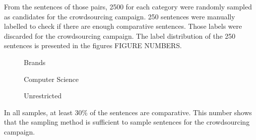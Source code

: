 From the sentences of those pairs, 2500 for each category were randomly sampled as candidates for the crowdsourcing campaign. 250 sentences were manually labelled to check if there are enough comparative sentences. Those labels were discarded for the crowdsourcing campaign.
The label distribution of the 250 sentences is presented in the figures FIGURE NUMBERS.

\begin{figure}[h]
    \centering
    \begin{minipage}{0.49\textwidth}
        \centering
               \caption{Brands}
    \end{minipage}\hfill
    \begin{minipage}{0.49\textwidth}
        \centering
        \caption{Computer Science}
    \end{minipage}
    \end{figure}
    
    \begin{figure}[h]
    \centering
    \begin{minipage}{0.49\textwidth}
        \centering
               \caption{Unrestricted}
    \end{minipage}\hfill
    \end{figure}
    
In all samples, at least 30\% of the sentences are comparative. This number shows that the sampling method is sufficient to sample sentences for the crowdsourcing campaign.
